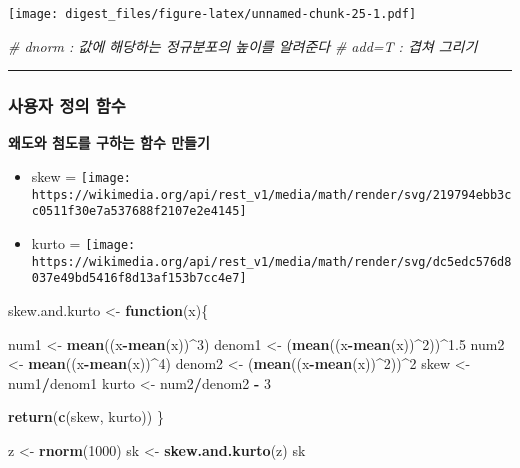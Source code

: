\documentclass[]{article}
\newenvironment{Shaded}{\begin{snugshade}}{\end{snugshade}}
\newcommand{\KeywordTok}[1]{\textcolor[rgb]{0.13,0.29,0.53}{\textbf{#1}}}
\newcommand{\DecValTok}[1]{\textcolor[rgb]{0.00,0.00,0.81}{#1}}
\newcommand{\FloatTok}[1]{\textcolor[rgb]{0.00,0.00,0.81}{#1}}
\newcommand{\StringTok}[1]{\textcolor[rgb]{0.31,0.60,0.02}{#1}}
\newcommand{\CommentTok}[1]{\textcolor[rgb]{0.56,0.35,0.01}{\textit{#1}}}
\newcommand{\ControlFlowTok}[1]{\textcolor[rgb]{0.13,0.29,0.53}{\textbf{#1}}}
\newcommand{\OperatorTok}[1]{\textcolor[rgb]{0.81,0.36,0.00}{\textbf{#1}}}
\newcommand{\NormalTok}[1]{#1}
\providecommand{\tightlist}{%
  \setlength{\itemsep}{0pt}\setlength{\parskip}{0pt}}
\begin{document}
\texttt{[image: digest\_files/figure-latex/unnamed-chunk-25-1.pdf]}

\begin{Shaded}
\begin{Highlighting}[]
  \CommentTok{# dnorm : 값에 해당하는 정규분포의 높이를 알려준다}
  \CommentTok{# add=T : 겹쳐 그리기}
\end{Highlighting}
\end{Shaded}

\begin{center}\rule{0.5\linewidth}{\linethickness}\end{center}

\subsubsection{사용자 정의 함수}\label{--}

\textbf{왜도와 첨도를 구하는 함수 만들기}

\begin{itemize}
\tightlist
\item
  skew =
  \texttt{[image: https://wikimedia.org/api/rest\_v1/media/math/render/svg/219794ebb3cc0511f30e7a537688f2107e2e4145]}
\item
  kurto =
  \texttt{[image: https://wikimedia.org/api/rest\_v1/media/math/render/svg/dc5edc576d8037e49bd5416f8d13af153b7cc4e7]}
\end{itemize}

\begin{Shaded}
\begin{Highlighting}[]
\NormalTok{skew.and.kurto <-}\StringTok{ }\ControlFlowTok{function}\NormalTok{(x)\{}

\NormalTok{  num1 <-}\StringTok{ }\KeywordTok{mean}\NormalTok{((x}\OperatorTok{-}\KeywordTok{mean}\NormalTok{(x))}\OperatorTok{^}\DecValTok{3}\NormalTok{)}
\NormalTok{  denom1 <-}\StringTok{ }\NormalTok{(}\KeywordTok{mean}\NormalTok{((x}\OperatorTok{-}\KeywordTok{mean}\NormalTok{(x))}\OperatorTok{^}\DecValTok{2}\NormalTok{))}\OperatorTok{^}\FloatTok{1.5}
\NormalTok{  num2 <-}\StringTok{ }\KeywordTok{mean}\NormalTok{((x}\OperatorTok{-}\KeywordTok{mean}\NormalTok{(x))}\OperatorTok{^}\DecValTok{4}\NormalTok{)}
\NormalTok{  denom2 <-}\StringTok{ }\NormalTok{(}\KeywordTok{mean}\NormalTok{((x}\OperatorTok{-}\KeywordTok{mean}\NormalTok{(x))}\OperatorTok{^}\DecValTok{2}\NormalTok{))}\OperatorTok{^}\DecValTok{2}
\NormalTok{  skew <-}\StringTok{ }\NormalTok{num1}\OperatorTok{/}\NormalTok{denom1}
\NormalTok{  kurto <-}\StringTok{ }\NormalTok{num2}\OperatorTok{/}\NormalTok{denom2 }\OperatorTok{-}\StringTok{ }\DecValTok{3}
  
  \KeywordTok{return}\NormalTok{(}\KeywordTok{c}\NormalTok{(skew, kurto))}
\NormalTok{\}}

\NormalTok{z <-}\StringTok{ }\KeywordTok{rnorm}\NormalTok{(}\DecValTok{1000}\NormalTok{)}
\NormalTok{sk <-}\StringTok{ }\KeywordTok{skew.and.kurto}\NormalTok{(z)}
\NormalTok{sk}
\end{Highlighting}
\end{Shaded}
\end{document}
